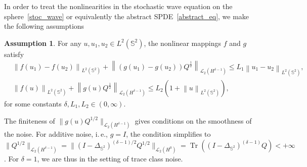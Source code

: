 \documentclass[a4paper]{amsart}
\theoremstyle{remark}
\theoremstyle{definition}
\newtheorem{ass}[thm]{Assumption}
\newcommand{\IS}{\mathbb{S}}
\newcommand{\trace}{\operatorname{Tr}}
\begin{document}
In order to treat the nonlinearities in the stochastic wave equation on the sphere~\eqref{stoc_wave} or equivalently the abstract SPDE~\eqref{abstract_eq}, we make the following assumptions
\begin{ass}
\label{ass_compact}
For any $u,u_1,u_2 \in L^2(\mathbb{S}^2)$, the nonlinear mappings 
$f$ and $g$ satisfy
$$
\begin{aligned}
&\left\|f(u_1)-f(u_2)\right\|_{L^2(\mathbb{S}^2)} +\left\|\left(g(u_1)-g(u_2)\right)Q^{\frac{1}{2}}\right\|_{\mathcal{L}_2(H^{\delta-1})} \le L_1 \left\|u_1-u_2\right\|_{L^2(\mathbb{S}^2)},\\
&\left\|f(u)\right\|_{L^2(\mathbb{S}^2)}+\left\|g(u)Q^{\frac{1}{2}}\right\|_{\mathcal{L}_2(H^{\delta-1})}\le L_2 \left(1+\left\|u\right\|_{L^2(\mathbb{S}^2)}\right),
\end{aligned}
$$
for some constants $\delta, L_1, L_2\in(0,\infty)$. 
\end{ass}

The finiteness of $\|g(u)Q^{1/2}\|_{\mathcal{L}_2(H^{\delta-1})}$ gives conditions on the smoothness of the noise. For additive noise, i.\,e., $g = I$, the condition simplifies to $\|Q^{1/2}\|_{\mathcal{L}_2(H^{\delta-1})} = \|(I- \Delta_{\IS^2})^{(\delta-1)/2} Q^{1/2}\|_{\mathcal{L}_2(H^0)} = \trace ((I-\Delta_{\IS^2})^{(\delta-1)} Q) < + \infty$. For $\delta = 1$, we are thus in the setting of trace class noise.
\end{document}
